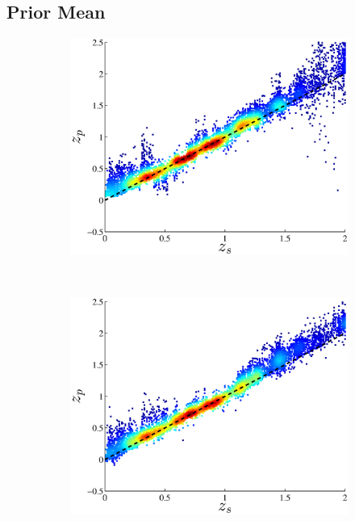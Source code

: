 \documentclass[useAMS,usenatbib,fleqn]{mn2e}
\begin{document}
\subsection{Prior Mean}

\begin{figure}
        \centering
        \begin{subfigure}[b]{0.24\textwidth}
                \includegraphics[width=\textwidth]{figures/23_0.eps}
        \end{subfigure}
        ~
        \begin{subfigure}[b]{0.24\textwidth}
                \includegraphics[width=\textwidth]{figures/23_L.eps}

\end{subfigure}
\end{figure}
\end{document}
